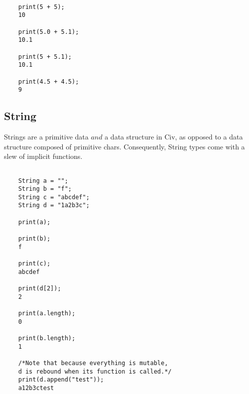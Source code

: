 \documentclass[a4paper]{article}
\begin{document}
{\selectfont
\begin{lstlisting} 

    print(5 + 5);
    10
    
    print(5.0 + 5.1);
    10.1
    
    print(5 + 5.1);
    10.1
    
    print(4.5 + 4.5);
    9

\end{lstlisting}
}

\subsection{String}
Strings are a primitive data $and$ a data structure in Civ, as opposed to a data structure composed of primitive chars. Consequently, String types come with a slew of implicit functions.

{\selectfont
\begin{lstlisting}

    String a = "";
    String b = "f";
    String c = "abcdef";
    String d = "1a2b3c";
    
    print(a);
    
    print(b);
    f
    
    print(c);
    abcdef
    
    print(d[2]);
    2
    
    print(a.length);
    0
    
    print(b.length);
    1
    
    /*Note that because everything is mutable,
    d is rebound when its function is called.*/
    print(d.append("test"));
    a12b3ctest
	
\end{lstlisting}
}
\end{document}
